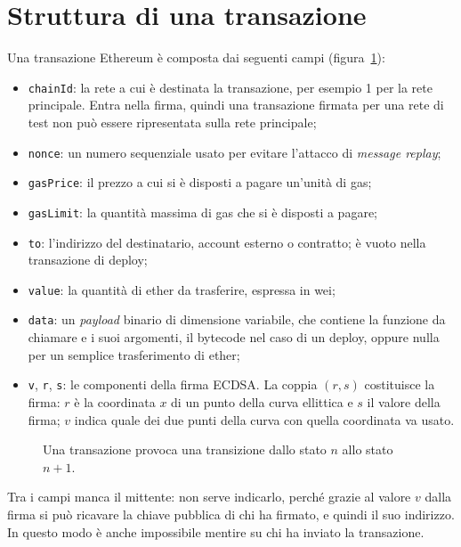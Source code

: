 \documentclass[a4paper, 11pt, oneside]{book}
\newcommand{\cod}[1]{\texttt{#1}} %
\begin{document}
	\section{Struttura di una transazione}\label{sec:struttura-transazione}
	Una transazione Ethereum è composta dai seguenti campi
	(figura~\ref{fig:transazione}):
	\begin{itemize}
		\item \cod{chainId}: la rete a cui è destinata la transazione, per esempio 1 per
			la rete principale. Entra nella firma, quindi una transazione firmata per una
			rete di test non può essere ripresentata sulla rete principale;
		\item \cod{nonce}: un numero sequenziale usato per evitare l'attacco di
			\textit{message replay};
		\item \cod{gasPrice}: il prezzo a cui si è disposti a pagare un'unità di gas;
		\item \cod{gasLimit}: la quantità massima di gas che si è disposti a pagare;
		\item \cod{to}: l'indirizzo del destinatario, account esterno o contratto; è
			vuoto nella transazione di deploy;
		\item \cod{value}: la quantità di ether da trasferire, espressa in wei;
		\item \cod{data}: un \textit{payload} binario di dimensione variabile, che
			contiene la funzione da chiamare e i suoi argomenti, il bytecode nel caso di
			un deploy, oppure nulla per un semplice trasferimento di ether;
		\item \cod{v}, \cod{r}, \cod{s}: le componenti della firma ECDSA. La coppia
			$(r, s)$ costituisce la firma: $r$ è la coordinata $x$ di un punto della curva
			ellittica e $s$ il valore della firma; $v$ indica quale dei due punti della
			curva con quella coordinata va usato.
	\end{itemize}

	\begin{figure}[H]
		\centering
		
		\caption{Una transazione provoca una transizione dallo stato $n$ allo stato
			$n+1$.}
		\label{fig:transazione}
	\end{figure}

	Tra i campi manca il mittente: non serve indicarlo, perché grazie al valore $v$
	dalla firma si può ricavare la chiave pubblica di chi ha firmato, e quindi il suo
	indirizzo. In questo modo è anche impossibile mentire su chi ha inviato la
	transazione.
\end{document}
